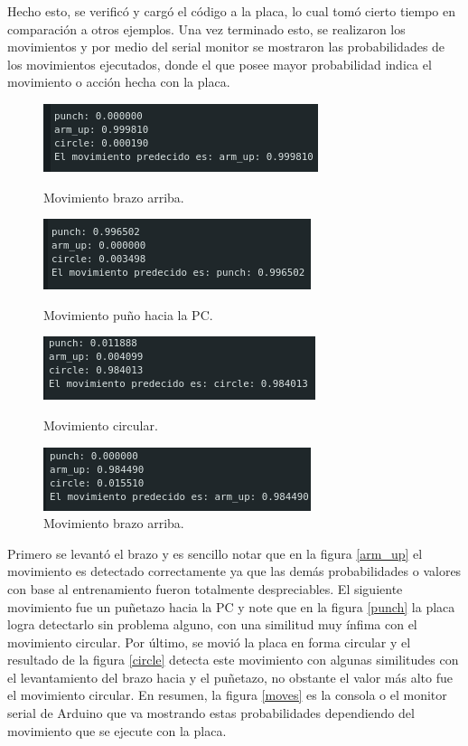 Hecho esto, se verificó y cargó el código a la placa, lo cual tomó cierto tiempo en comparación a otros ejemplos. Una vez terminado esto, se realizaron los movimientos y por medio del serial monitor se mostraron las probabilidades de los movimientos ejecutados, donde el que posee mayor probabilidad indica  el movimiento o acción hecha con la placa.
\begin{figure}[H]
   \begin{minipage}{0.5\textwidth}
     \centering
     \includegraphics[width=.48\linewidth]{Imagenes/arm_up.png}
     \caption{ Movimiento brazo arriba.}\label{arm_up}
   \end{minipage}\hfill
   \begin{minipage}{0.5\textwidth}
     \centering
     \includegraphics[width=.48\linewidth]{Imagenes/punch.png}
     \caption{Movimiento puño hacia la PC. }\label{punch}
   \end{minipage}
      \begin{minipage}{0.5\textwidth}
     \centering
     \includegraphics[width=.48\linewidth]{Imagenes/circle.png}
     \caption{Movimiento circular. }\label{circle}
   \end{minipage}
    \begin{minipage}{0.5\textwidth}
     \centering
     \includegraphics[width=.48\linewidth]{Imagenes/brazo_up.png}
     \caption{Movimiento brazo arriba. }\label{brazo_up}
   \end{minipage}
\end{figure}
Primero se levantó el brazo y es sencillo notar que en la figura \ref{arm_up} el movimiento es detectado correctamente ya que las demás probabilidades o valores con base al entrenamiento fueron totalmente despreciables. El siguiente movimiento fue un puñetazo hacia la PC y note que en la figura \ref{punch} la placa logra detectarlo sin problema alguno, con una similitud muy ínfima con el movimiento circular. Por último, se movió la placa en forma circular y el resultado de la figura \ref{circle} detecta este movimiento con algunas similitudes con el levantamiento del brazo hacia y el puñetazo, no obstante el valor más alto fue el movimiento circular. En resumen, la figura \ref{moves} es la consola o el monitor serial de Arduino que va mostrando estas probabilidades dependiendo del movimiento que se ejecute con la placa.
